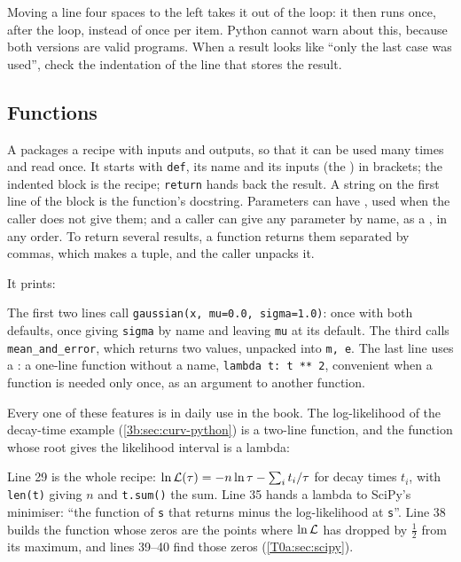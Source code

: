 \begin{pitfall}
Moving a line four spaces to the left takes it out of the loop: it then runs once, after the loop, instead of once per item. Python cannot warn about this, because both versions are valid programs. When a result looks like ``only the last case was used'', check the indentation of the line that stores the result.
\end{pitfall}

\subsection{Functions}
\label{T0a:sec:functions}

A  packages a recipe with inputs and outputs, so that it can be used many times and read once. It starts with \texttt{def}, its name and its inputs (the ) in brackets; the indented block is the recipe; \texttt{return} hands back the result. A string on the first line of the block is the function's docstring. Parameters can have , used when the caller does not give them; and a caller can give any parameter by name, as a , in any order. To return several results, a function returns them separated by commas, which makes a tuple, and the caller unpacks it.

\noindent It prints:

The first two lines call \texttt{gaussian(x, mu=0.0, sigma=1.0)}: once with both defaults, once giving \texttt{sigma} by name and leaving \texttt{mu} at its default. The third calls \texttt{mean\_and\_error}, which returns two values, unpacked into \texttt{m, e}. The last line uses a : a one-line function without a name, \texttt{lambda t: t ** 2}, convenient when a function is needed only once, as an argument to another function.

Every one of these features is in daily use in the book. The log-likelihood of the decay-time example (\cref{3b:sec:curv-python}) is a two-line function, and the function whose root gives the likelihood interval is a lambda:


Line 29 is the whole recipe: $\ln\mathcal{L}(\tau)=-n\ln\tau-\sum_i t_i/\tau$ for decay times $t_i$, with \texttt{len(t)} giving $n$ and \texttt{t.sum()} the sum. Line 35 hands a lambda to SciPy's minimiser: ``the function of \texttt{s} that returns minus the log-likelihood at \texttt{s}''. Line 38 builds the function whose zeros are the points where $\ln\mathcal{L}$ has dropped by $\tfrac12$ from its maximum, and lines 39--40 find those zeros (\cref{T0a:sec:scipy}).

